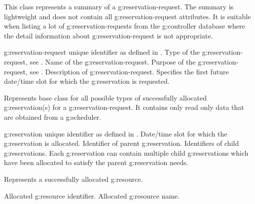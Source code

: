 \begin{Api}
This class represents a summary of a \gls{g:reservation-request}. The summary is lightweight and does not contain all \gls{g:reservation-request} attributes. It is suitable when listing a lot of \glspl{g:reservation-request} from the \gls{g:controller} database where the detail information about \gls{g:reservation-request} is not appropriate.
\begin{ApiClassAttributes}
 \Gls{g:reservation-request} unique identifier as defined in .
 Type of the \gls{g:reservation-request}, see .
 Name of the \gls{g:reservation-request}.
 Purpose of the \gls{g:reservation-request}, see .
 Description of \gls{g:reservation-request}.
 Specifies the first future date/time slot for which the \gls{g:reservation} is requested.
\end{ApiClassAttributes}

Represents base class for all possible types of successfully allocated \gls{g:reservation}(s) for a \gls{g:reservation-request}. It contains only read only data that are obtained from a \gls{g:scheduler}.
\begin{ApiClassAttributes}
 \Gls{g:reservation} unique identifier as defined in .
 Date/time slot for which the \gls{g:reservation} is allocated.
 Identifier of parent \gls{g:reservation}.
 Identifiers of child \glspl{g:reservation}. Each \gls{g:reservation} can contain multiple child \glspl{g:reservation} which have been allocated to satisfy the parent \gls{g:reservation} needs.
\end{ApiClassAttributes}

Represents a successfully allocated \gls{g:resource}.
\begin{ApiClassAttributes}
 Allocated \gls{g:resource} identifier.
 Allocated \gls{g:resource} name. 
\end{ApiClassAttributes}


\end{Api}
